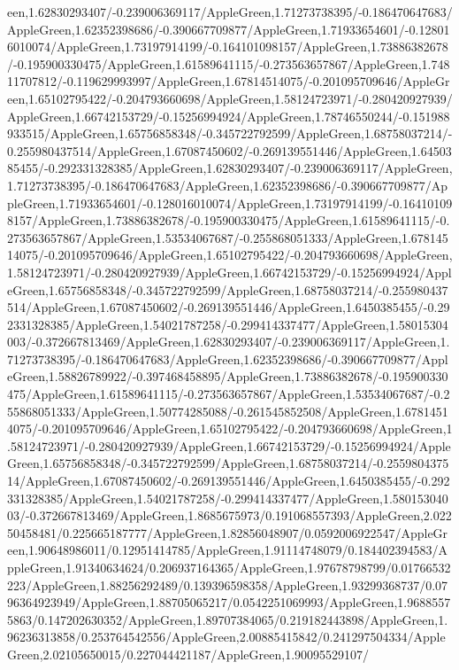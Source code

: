 {\begin{tikzternal}
{een,1.62830293407/-0.239006369117/AppleGreen,1.71273738395/-0.186470647683/AppleGreen,1.62352398686/-0.390667709877/AppleGreen,1.71933654601/-0.128016010074/AppleGreen,1.73197914199/-0.164101098157/AppleGreen,1.73886382678/-0.195900330475/AppleGreen,1.61589641115/-0.273563657867/AppleGreen,1.74811707812/-0.119629993997/AppleGreen,1.67814514075/-0.201095709646/AppleGreen,1.65102795422/-0.204793660698/AppleGreen,1.58124723971/-0.280420927939/AppleGreen,1.66742153729/-0.15256994924/AppleGreen,1.78746550244/-0.151988933515/AppleGreen,1.65756858348/-0.345722792599/AppleGreen,1.68758037214/-0.255980437514/AppleGreen,1.67087450602/-0.269139551446/AppleGreen,1.6450385455/-0.292331328385/AppleGreen,1.62830293407/-0.239006369117/AppleGreen,1.71273738395/-0.186470647683/AppleGreen,1.62352398686/-0.390667709877/AppleGreen,1.71933654601/-0.128016010074/AppleGreen,1.73197914199/-0.164101098157/AppleGreen,1.73886382678/-0.195900330475/AppleGreen,1.61589641115/-0.273563657867/AppleGreen,1.53534067687/-0.255868051333/AppleGreen,1.67814514075/-0.201095709646/AppleGreen,1.65102795422/-0.204793660698/AppleGreen,1.58124723971/-0.280420927939/AppleGreen,1.66742153729/-0.15256994924/AppleGreen,1.65756858348/-0.345722792599/AppleGreen,1.68758037214/-0.255980437514/AppleGreen,1.67087450602/-0.269139551446/AppleGreen,1.6450385455/-0.292331328385/AppleGreen,1.54021787258/-0.299414337477/AppleGreen,1.58015304003/-0.372667813469/AppleGreen,1.62830293407/-0.239006369117/AppleGreen,1.71273738395/-0.186470647683/AppleGreen,1.62352398686/-0.390667709877/AppleGreen,1.58826789922/-0.397468458895/AppleGreen,1.73886382678/-0.195900330475/AppleGreen,1.61589641115/-0.273563657867/AppleGreen,1.53534067687/-0.255868051333/AppleGreen,1.50774285088/-0.261545852508/AppleGreen,1.67814514075/-0.201095709646/AppleGreen,1.65102795422/-0.204793660698/AppleGreen,1.58124723971/-0.280420927939/AppleGreen,1.66742153729/-0.15256994924/AppleGreen,1.65756858348/-0.345722792599/AppleGreen,1.68758037214/-0.255980437514/AppleGreen,1.67087450602/-0.269139551446/AppleGreen,1.6450385455/-0.292331328385/AppleGreen,1.54021787258/-0.299414337477/AppleGreen,1.58015304003/-0.372667813469/AppleGreen,1.8685675973/0.191068557393/AppleGreen,2.02250458481/0.225665187777/AppleGreen,1.82856048907/0.0592006922547/AppleGreen,1.90648986011/0.12951414785/AppleGreen,1.91114748079/0.184402394583/AppleGreen,1.91340634624/0.206937164365/AppleGreen,1.97678798799/0.01766532223/AppleGreen,1.88256292489/0.139396598358/AppleGreen,1.93299368737/0.0796364923949/AppleGreen,1.88705065217/0.0542251069993/AppleGreen,1.96885575863/0.147202630352/AppleGreen,1.89707384065/0.219182443898/AppleGreen,1.96236313858/0.253764542556/AppleGreen,2.00885415842/0.241297504334/AppleGreen,2.02105650015/0.227044421187/AppleGreen,1.90095529107/
}
\end{tikzternal}}
